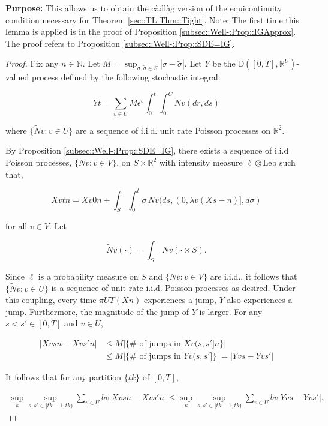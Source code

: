 \documentclass[12pt]{article}
\newcommand{\mb}{\mathbb}
\newcommand{\te}{\text}
\newcommand{\ep}{\epsilon}
\newcommand{\purpose}{\textbf{Purpose: }}
\newcommand{\ind}{\hspace{24pt}}
\newcommand{\cad}{\mb{D}}							%
\renewcommand{\v}{v}							%
\renewcommand{\U}{U}							%
\renewcommand{\S}{S}							%
\newcommand{\s}{\sigma}							%
\renewcommand{\b}{b}							%
\newcommand{\ev}{\ep}							%
\newcommand{\T}{T}								%
\renewcommand{\t}{t}							%
\newcommand{\proj}{\pi}							%
\renewcommand{\tt}{s}							%
\newcommand{\ttt}{s'}							%
\newcommand{\X}{X}								%
\newcommand{\vind}[1]{^{#1}}					%
\newcommand{\const}{C}							%
\renewcommand{\ss}{\tilde{\s}}					%
\newcommand{\poiss}{N}							%
\newcommand{\leb}{\te{Leb}}						%
\newcommand{\Sm}{\ell}							%
\newcommand{\rate}{\lambda}						%
\renewcommand{\r}{r}							%
\newcommand{\cconst}{M}							%
\newcommand{\alt}[1]{\widetilde{#1}}			%
\newcommand{\XX}{Y}								%
\renewcommand{\it}{k}							%
\begin{document}
\purpose This allows us to obtain the c\`adl\`ag version of the equicontinuity condition necessary for Theorem \ref{sec::TL:Thm::Tight}. Note: The first time this lemma is applied is in the proof of Proposition \ref{subsec::Well-:Prop::IGApprox}. The proof refers to Proposition \ref{subsec::Well-:Prop::SDE=IG}.

\begin{proof}
Fix any \(n \in \mb{N}\). Let \(\cconst = \sup_{\s,\ss \in \S} |\s - \ss|\). Let \(\XX{}{}\) be the \(\cad([0,\T],\mb{R}^\U)\)-valued process defined by the following stochastic integral:

\[\XX{}{\t} = \sum_{\v \in \U}\cconst\ev\vind{\v}\int_0^\t\int_0^{\const{}}\alt{\poiss}{\v}(d\r, d\tt)\]

where \(\{\alt{\poiss}{\v}:\v \in \U\}\) are a sequence of i.i.d. unit rate Poisson processes on \(\mb{R}^2\). 

\ind By Proposition \ref{subsec::Well-:Prop::SDE=IG}, there exists a sequence of i.i.d Poisson processes, \(\{\poiss{\v}:\v\in V\}\), on \(\S\times\mb{R}^2\) with intensity measure \(\Sm\otimes \leb\) such that,

\[\X{\v}{\t}{n} = \X{\v}{0}{n} + \int_\S\int_0^\t \s\,\poiss{\v}(d\tt,(0,\rate{\v}(\X{}{\tt-}{n})],d\s)\]

for all \(\v\in V\). Let

\[\alt{\poiss}{\v}(\cdot) = \int_\S\,\poiss{\v}(\cdot\times \S).\]

Since \(\Sm\) is a probability measure on \(\S\) and \(\{\poiss{\v}:\v\in V\}\) are i.i.d., it follows that \(\{\alt{\poiss}{\v}:\v\in \U\}\) is a sequence of unit rate i.i.d. Poisson processes as desired. Under this coupling, every time \(\proj{\U}{\T}(\X{}{}{n})\) experiences a jump, \(\XX{}{}\) also experiences a jump. Furthermore, the magnitude of the jump of \(\XX{}{}\) is larger. For any \(\tt<\ttt\in [0,\T]\) and \(\v\in \U\),

\begin{align*}
|\X{\v}{\tt}{n} - \X{\v}{\ttt}{n}|&\leq \cconst\left|\{\#\te{ of jumps in }\X{\v}{(\tt,\ttt]}{n}\}\right| \\
&\leq \cconst\left|\{\#\te{ of jumps in }\XX{\v}{(\tt,\ttt]}\}\right| = \left|\XX{\v}{\tt} - \XX{\v}{\ttt}\right|
\end{align*}

It follows that for any partition \(\{\t{\it}\}\) of \([0,\T]\),

\begin{align*}
\sup_\it\sup_{\tt,\ttt \in [\t{\it-1},\t{\it})} \sum_{\v\in \U} \b{\v}|\X{\v}{\tt}{n} - \X{\v}{\ttt}{n}|\leq \sup_\it\sup_{\tt,\ttt \in [\t{\it-1},\t{\it})} \sum_{\v\in \U} \b{\v}|\XX{\v}{\tt} - \XX{\v}{\ttt}|.
\end{align*}


\end{proof}
\end{document}
